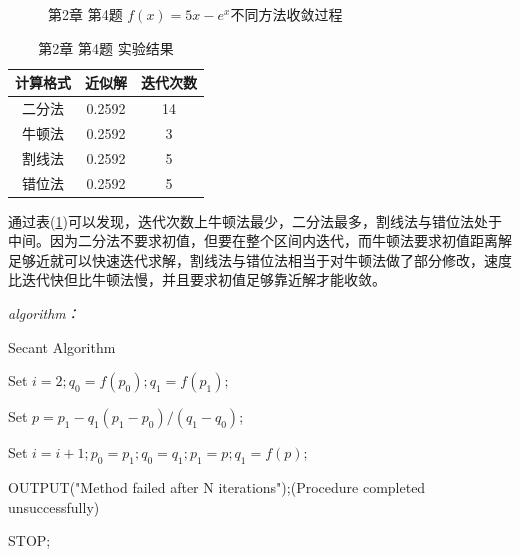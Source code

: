 \documentclass[12pt]{ctexart}
\begin{document}
\begin{figure}[htbp]
{		} \quad
		\caption{第2章 第4题 $f(x)=5x-e^x$不同方法收敛过程}
	\end{figure}
	
	\begin{table}[htbp]
		\centering
		\caption{第2章 第4题 实验结果}\label{e2_4}
		\begin{tabular}
			{c|c|c}
			\hline
			计算格式&近似解&迭代次数 \\
			\hline
			二分法&0.2592&14 \\
			\hline
			牛顿法&0.2592&3 \\
			\hline
			割线法&0.2592&5 \\
			\hline
			错位法&0.2592&5 \\
			\hline
		\end{tabular}
	\end{table}
	
	通过表(\ref{e2_4})可以发现，迭代次数上牛顿法最少，二分法最多，割线法与错位法处于中间。因为二分法不要求初值，但要在整个区间内迭代，而牛顿法要求初值距离解足够近就可以快速迭代求解，割线法与错位法相当于对牛顿法做了部分修改，速度比迭代快但比牛顿法慢，并且要求初值足够靠近解才能收敛。
	
	\textit{algorithm：}
	
	\begin{algorithm}
		\caption{Secant Algorithm}
		Set $i=2; q_0=f(p_0); q_1=f(p_1);$
		
		{
			Set $p=p_1-q_1(p_1-p_0)/(q_1-q_0)$;
			
			
			Set $i=i+1; p_0=p_1; q_0=q_1; p_1=p; q_1=f(p);$
		}
		
		OUTPUT("Method failed after N iterations");(Procedure completed unsuccessfully)
		
		STOP;
	\end{algorithm}
\end{document}
